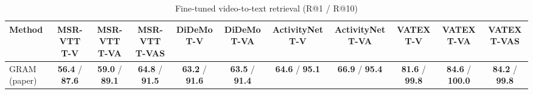 \begin{table}[t]
\centering
\caption{Fine-tuned video-to-text retrieval (R@1 / R@10)}
\label{tab:finetune_v2t}
\small
\begin{tabular}{lcccccccccc}
\toprule
Method & MSR-VTT T-V & MSR-VTT T-VA & MSR-VTT T-VAS & DiDeMo T-V & DiDeMo T-VA & ActivityNet T-V & ActivityNet T-VA & VATEX T-V & VATEX T-VA & VATEX T-VAS \\
\midrule
GRAM (paper) & \textbf{56.4} / \textbf{87.6} & \textbf{59.0} / \textbf{89.1} & \textbf{64.8} / \textbf{91.5} & \textbf{63.2} / \textbf{91.6} & \textbf{63.5} / \textbf{91.4} & \textbf{64.6} / \textbf{95.1} & \textbf{66.9} / \textbf{95.4} & \textbf{81.6} / \textbf{99.8} & \textbf{84.6} / \textbf{100.0} & \textbf{84.2} / \textbf{99.8} \\
\bottomrule
\end{tabular}
\end{table}
